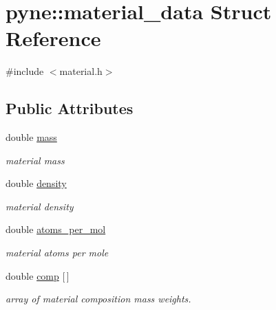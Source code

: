 \hypertarget{structpyne_1_1material__data}{\section{pyne\+:\+:material\+\_\+data Struct Reference}
\label{structpyne_1_1material__data}
}


{\ttfamily \#include $<$material.\+h$>$}

\subsection*{Public Attributes}
\begin{DoxyCompactItemize}
\item 
\hypertarget{structpyne_1_1material__data_a8e5fa2bf074f5c7770fcefca825640b9}{double \hyperlink{structpyne_1_1material__data_a8e5fa2bf074f5c7770fcefca825640b9}{mass}}\label{structpyne_1_1material__data_a8e5fa2bf074f5c7770fcefca825640b9}

\begin{DoxyCompactList}\small\item\em material mass \end{DoxyCompactList}\item 
\hypertarget{structpyne_1_1material__data_adf19d9e0612f5ea9c6093ad09c63eee4}{double \hyperlink{structpyne_1_1material__data_adf19d9e0612f5ea9c6093ad09c63eee4}{density}}\label{structpyne_1_1material__data_adf19d9e0612f5ea9c6093ad09c63eee4}

\begin{DoxyCompactList}\small\item\em material density \end{DoxyCompactList}\item 
\hypertarget{structpyne_1_1material__data_a135b69d35e0bc6c49a025a24cb153798}{double \hyperlink{structpyne_1_1material__data_a135b69d35e0bc6c49a025a24cb153798}{atoms\+\_\+per\+\_\+mol}}\label{structpyne_1_1material__data_a135b69d35e0bc6c49a025a24cb153798}

\begin{DoxyCompactList}\small\item\em material atoms per mole \end{DoxyCompactList}\item 
\hypertarget{structpyne_1_1material__data_a5fc15bdb605f1bcfc07bf0e84fd98289}{double \hyperlink{structpyne_1_1material__data_a5fc15bdb605f1bcfc07bf0e84fd98289}{comp} \mbox{[}$\,$\mbox{]}}\label{structpyne_1_1material__data_a5fc15bdb605f1bcfc07bf0e84fd98289}

\begin{DoxyCompactList}\small\item\em array of material composition mass weights. \end{DoxyCompactList}\end{DoxyCompactItemize}


